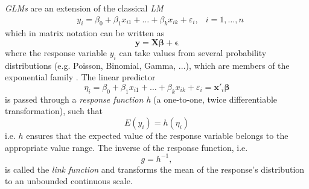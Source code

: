 \textit{\acp{GLM}} are an extension of the classical \textit{\ac{LM}}
$$
\begin{aligned}
&y_{i}=\beta_{0}+\beta_{1} x_{i 1}+\ldots+\beta_{k} x_{i k}+\varepsilon_{i}, &i=1, \ldots, n
\end{aligned}
$$
which in matrix notation can be written as
$$ \bm{y} = \bm{X}\bm{\beta} + \bm{\epsilon} $$
where the response variable $y_i$ can take values from several probability distributions (e.g. Poisson, Binomial, Gamma, ...), which are members of the exponential family \citep{fahrmeir2003regression}. The linear predictor 
\begin{equation} 
\eta_i = \beta_{0}+\beta_{1} x_{i 1}+\ldots+\beta_{k} x_{i k}+\varepsilon_{i} = \bm{x'}_i \bm{\beta}
\label{eq:linear_predictor_glm}
\end{equation}
is passed through a \textit{response function h} (a one-to-one, twice differentiable transformation), such that
\begin{equation}
 E(y_i) = h(\eta_i) 
\label{eq:response_function}
\end{equation}
i.e. $h$ ensures that the expected value of the response variable belongs to the appropriate value range. The inverse of the response function, i.e.
\begin{equation}
g = h^{-1},
\label{eq:link_function}
\end{equation} 
is called the \textit{link function} and transforms the mean of the response's distribution to an unbounded continuous scale.




